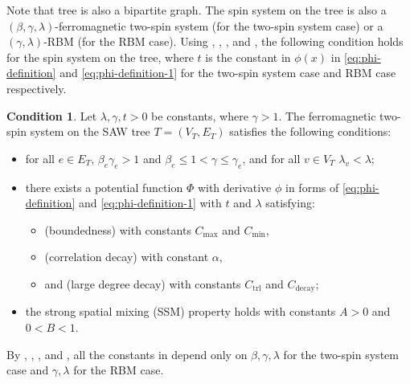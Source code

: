\documentclass[11pt]{amsart}
\theoremstyle{definition}
\newtheorem{condition}[theorem]{Condition}
\theoremstyle{remark}
\begin{document}
Note that tree is also a bipartite graph. The spin system on the tree is also a $(\beta,\gamma,\lambda)$-ferromagnetic two-spin system (for the two-spin system case) or a $(\gamma,\lambda)$-RBM (for the RBM case). Using , , , and , the following condition holds for the spin system on the tree, where $t$ is the constant in $\phi(x)$ in \eqref{eq:phi-definition} and \eqref{eq:phi-definition-1} for the two-spin system case and RBM case respectively.
\begin{condition}\label{condition}
    Let $\lambda,\gamma,t > 0$ be constants, where $\gamma > 1$.
    The ferromagnetic two-spin system on the SAW tree $T = (V_T,E_T)$ satisfies the following conditions:
  \begin{itemize}
    \item for all $e \in E_T$, $\beta_e\gamma_e > 1$ and $\beta_e \leq 1 < \gamma \leq  \gamma_e$, and for all $v \in V_T$ $\lambda_v < \lambda$;
    \item there exists a potential function $\Phi$ with derivative $\phi$ in forms of \eqref{eq:phi-definition} and \eqref{eq:phi-definition-1} with $t$ and $\lambda$ satisfying:
       \begin{itemize}
         \item {} (boundedness) with constants $C_{\max}$ and $C_{\min}$,
         \item {} (correlation decay) with constant $\alpha$,
         \item and   (large degree decay) with constants $C_{\text{trl}}$ and $C_{\text{decay}}$;
       \end{itemize}
      \item the strong spatial mixing (SSM) property holds with constants $A> 0$ and $0 < B < 1$.
    \end{itemize}
\end{condition}
By , , , and , all the constants in  depend only on $\beta,\gamma,\lambda$ for the two-spin system case and $\gamma,\lambda$ for the RBM case.
\end{document}
